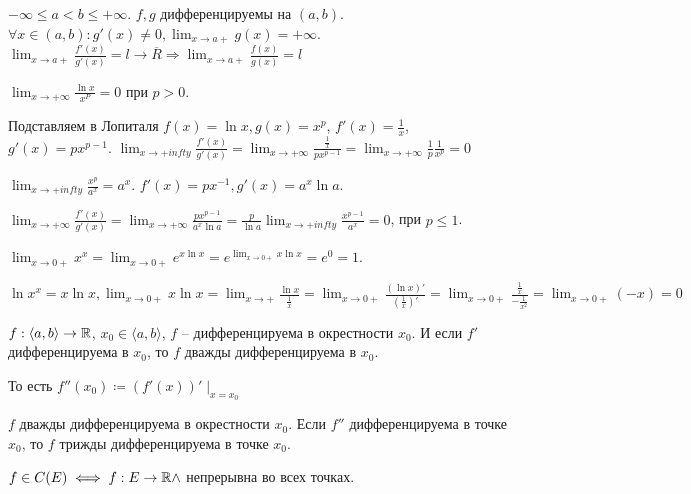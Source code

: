 \begin{theorem}
    $-\infty \le a < b \le +\infty$. $f, g$ дифференцируемы на  $(a, b)$.  $\forall x\in (a, b)\!: g'(x) \neq 0, \lim_{x \to a+}g(x) = +\infty$.  $\lim_{x \to a+} \frac{f'(x)}{g'(x)} =l \to \overline{R} \Rightarrow \lim_{x \to a+} \frac{f(x)}{g(x)} = l$
\end{theorem}
\begin{example}
    $\lim_{x \to +\infty} \frac{\ln x}{x^P} = 0$ при $p > 0$.

    Подставляем в Лопиталя  $f(x) = \ln x, g(x) = x^p$,  $f'(x) = \frac{1}{x}$, $g'(x) = px^{p - 1}$.  $\lim_{x \to +infty}\frac{f'(x)}{g'(x)} = \lim_{x \to +\infty} \frac{\frac{1}{x}}{px^{p-1}} = \lim_{x \to +\infty} \frac{1}{p} \frac{1}{x^p} = 0$
\end{example}
\begin{example}
    $\lim_{x \to +infty} \frac{x^p}{a^x} = a^x$. $f'(x) = px^{-1}, g'(x) = a^x \ln a$.

    $\lim_{x \to +\infty} \frac{f'(x)}{g'(x)} = \lim_{x \to +\infty} \frac{px^{p-1}}{a^x \ln a} =  \frac{p}{\ln a} \lim_{x \to +infty} \frac{x^{p-1}}{a^x} = 0$, при $p \le 1$.
\end{example}
\begin{example}
    $\lim_{x \to 0+} x^x = \lim_{x \to 0+} e^{x \ln x} = e^{\lim_{x \to 0+} x \ln x} = e^0 = 1$.
    
    $\ln x^x = x \ln x, \lim_{x \to 0+} x \ln x = \lim_{x \to +} \frac{\ln x}{\frac{1}{x}} = \lim_{x \to 0+} \frac{(\ln x)'}{(\frac{1}{x})'} = \lim_{x \to 0+} \frac{\frac{1}{x}}{-\frac{1}{x^2}} = \lim_{x \to 0+}(-x) = 0$
\end{example}
\begin{definition}
    $f: \langle a, b \rangle \to \mathbb{R}$,  $x_0 \in \langle a, b \rangle$, $f$ -- дифференцируема в окрестности  $x_0$.
    И если $f'$ дифференцируема в $x_0$, то $f$ дважды дифференцируема в $x_0$.

    То есть $f''(x_0) \coloneqq (f'(x))'\mid_{x=x_0}$
\end{definition}
\begin{definition}
    $f$ дважды дифференцируема в окрестности $x_0$. Если $f''$ дифференцируема в точке  $x_0$, то $f$ трижды дифференцируема в точке  $x_0$. 
\end{definition}
\begin{definition}
    $f \in C(E) \iff f: E \to \mathbb{R} \land$ непрерывна во всех точках.
\end{definition}
